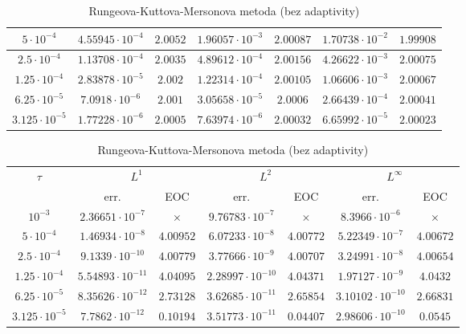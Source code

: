 \documentclass[11pt,american,czech]{article}
\begin{document}
\begin{table}[!htb]
\begin{tabular}{ |c||c|c|c|c|c|c| }
	$5\cdot10^{-4}$ & $4.55945\cdot10^{-4}$ & $2.0052$ & $1.96057\cdot10^{-3}$ & $2.00087$ & $1.70738\cdot10^{-2}$ & $1.99908$  \\ \hline
	$2.5\cdot10^{-4}$ & $1.13708\cdot10^{-4}$ & $2.0035$ & $4.89612\cdot10^{-4}$ & $2.00156$ & $4.26622\cdot10^{-3}$ & $2.00075$ \\ \hline
	$1.25\cdot10^{-4}$ & $2.83878\cdot10^{-5}$ & $2.002$ & $1.22314\cdot10^{-4}$ & $2.00105$ & $1.06606\cdot10^{-3}$ & $2.00067$  \\ \hline
	$6.25\cdot10^{-5}$ & $7.0918\cdot10^{-6}$ & $2.001$ & $3.05658\cdot10^{-5}$ & $2.0006$ & $2.66439\cdot10^{-4}$ & $2.00041$  \\ \hline 
	$3.125\cdot10^{-5}$ & $1.77228\cdot10^{-6}$ & $2.0005$ & $7.63974\cdot10^{-6}$ & $2.00032$ & $6.65992\cdot10^{-5}$ & $2.00023$  \\ \hline
	\end{tabular}
	\caption{Rungeova-Kuttova metoda 2. řádu}
	\vspace{0.75cm}
	\begin{tabular}{ |c||c|c|c|c|c|c| }
	  \hline

	\multirow{2}{*}{$\tau$} & \multicolumn{2}{c|}{$L^{1}$} & \multicolumn{2}{c|}{$L^{2}$} & \multicolumn{2}{c|}{$L^{\infty}$} \\ \hhline{~------}
	& err. &  EOC & err. & EOC & err. & EOC \\
	  \hline \hline
	$10^{-3}$ & $2.36651\cdot10^{-7}$ & $\times$ & $9.76783\cdot10^{-7}$ & $\times$ & $8.3966\cdot10^{-6}$ & $\times$  \\ \hline 
	$5\cdot10^{-4}$ & $1.46934\cdot10^{-8}$ & $4.00952$ & $6.07233\cdot10^{-8}$ & $4.00772$ & $5.22349\cdot10^{-7}$ & $4.00672$ \\ \hline
	$2.5\cdot10^{-4}$ & $9.1339\cdot10^{-10}$ & $4.00779$ & $3.77666\cdot10^{-9}$ & $4.00707$ & $3.24991\cdot10^{-8}$ & $4.00654$  \\ \hline
	$1.25\cdot10^{-4}$ & $5.54893\cdot10^{-11}$ & $4.04095$ & $2.28997\cdot10^{-10}$ & $4.04371$ & $1.97127\cdot10^{-9}$ & $4.0432$  \\ \hline
	$6.25\cdot10^{-5}$ & $8.35626\cdot10^{-12}$ & $2.73128$ & $3.62685\cdot10^{-11}$ & $2.65854$ & $3.10102\cdot10^{-10}$ & $2.66831$  \\ \hline
	$3.125\cdot10^{-5}$ & $7.7862\cdot10^{-12}$ & $0.10194$ & $3.51773\cdot10^{-11}$ & $0.04407$ & $2.98606\cdot10^{-10}$ & $0.0545$  \\ \hline
	\end{tabular}
	\caption{Rungeova-Kuttova-Mersonova metoda (bez adaptivity)}
\end{table}
\end{document}
